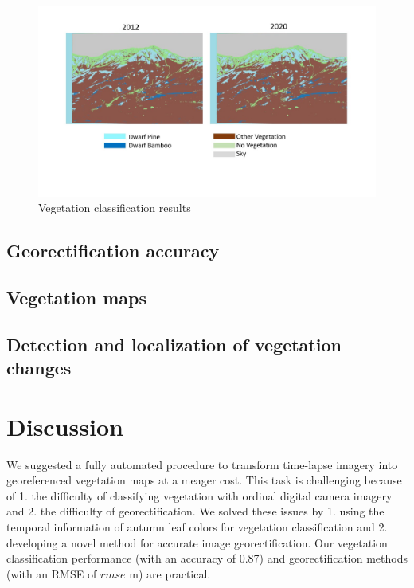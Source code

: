 \documentclass{article}
\begin{document}
\begin{figure}
\includegraphics[width=1\linewidth]{vegetation} \caption{Vegetation classification results}\label{fig:vegetation}
\end{figure}

\hypertarget{georectification-accuracy}{%
\subsection{Georectification accuracy}\label{georectification-accuracy}}

\hypertarget{vegetation-maps}{%
\subsection{Vegetation maps}\label{vegetation-maps}}

\hypertarget{detection-and-localization-of-vegetation-changes}{%
\subsection{Detection and localization of vegetation changes}\label{detection-and-localization-of-vegetation-changes}}

\hypertarget{discussion}{%
\section{Discussion}\label{discussion}}

We suggested a fully automated procedure to transform time-lapse imagery into georeferenced vegetation maps at a meager cost. This task is challenging because of 1. the difficulty of classifying vegetation with ordinal digital camera imagery and 2. the difficulty of georectification. We solved these issues by 1. using the temporal information of autumn leaf colors for vegetation classification and 2. developing a novel method for accurate image georectification. Our vegetation classification performance (with an accuracy of 0.87) and georectification methods (with an RMSE of \(rmse\) m) are practical.
\end{document}
